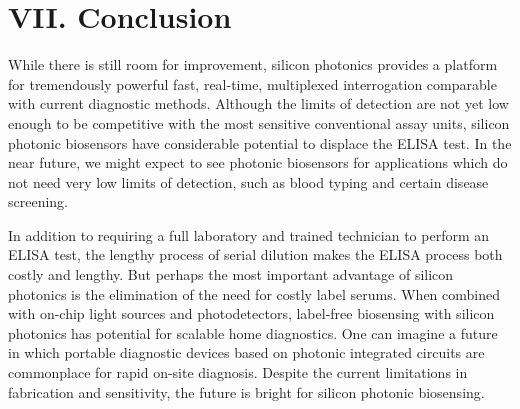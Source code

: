 \documentclass[aps,prl,twocolumn, superscriptaddress,nobalancelastpage]{revtex4}
\begin{document}
\section{VII. Conclusion}
\vspace{-1em}

While there is still room for improvement, silicon photonics provides a platform for tremendously powerful fast, real-time, multiplexed interrogation comparable with current diagnostic methods. Although the limits of detection are not yet low enough to be competitive with the most sensitive conventional assay units, silicon photonic biosensors have considerable potential to displace the ELISA test. In the near future, we might expect to see photonic biosensors for applications which do not need very low limits of detection, such as blood typing and certain disease screening. 

In addition to requiring a full laboratory and trained technician to perform an ELISA test, the lengthy process of serial dilution makes the ELISA process both costly and lengthy. But perhaps the most important advantage of silicon photonics is the elimination of the need for costly label serums. When combined with on-chip light sources and photodetectors, label-free biosensing with silicon photonics has potential for scalable home diagnostics. One can imagine a future in which portable diagnostic devices based on photonic integrated circuits are commonplace for rapid on-site diagnosis. Despite the current limitations in fabrication and sensitivity, the future is bright for silicon photonic biosensing.


\end{document}
